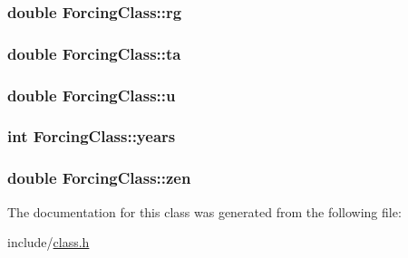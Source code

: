 \subsubsection[{\texorpdfstring{rg}{rg}}]{\setlength{\rightskip}{0pt plus 5cm}double Forcing\+Class\+::rg}\hypertarget{class_forcing_class_a532729ddef9c5b7bc69a9047dae1c846}{}\label{class_forcing_class_a532729ddef9c5b7bc69a9047dae1c846}
\subsubsection[{\texorpdfstring{ta}{ta}}]{\setlength{\rightskip}{0pt plus 5cm}double Forcing\+Class\+::ta}\hypertarget{class_forcing_class_aece37700263c8924187312ba098cd62b}{}\label{class_forcing_class_aece37700263c8924187312ba098cd62b}
\subsubsection[{\texorpdfstring{u}{u}}]{\setlength{\rightskip}{0pt plus 5cm}double Forcing\+Class\+::u}\hypertarget{class_forcing_class_ad22655f39b8411e4ef5dd9d52c76f465}{}\label{class_forcing_class_ad22655f39b8411e4ef5dd9d52c76f465}
\subsubsection[{\texorpdfstring{years}{years}}]{\setlength{\rightskip}{0pt plus 5cm}int Forcing\+Class\+::years}\hypertarget{class_forcing_class_a4100182ae2e6b94113197d349d87244e}{}\label{class_forcing_class_a4100182ae2e6b94113197d349d87244e}
\subsubsection[{\texorpdfstring{zen}{zen}}]{\setlength{\rightskip}{0pt plus 5cm}double Forcing\+Class\+::zen}\hypertarget{class_forcing_class_adadc2319d24d420e89dc8757afc87242}{}\label{class_forcing_class_adadc2319d24d420e89dc8757afc87242}


The documentation for this class was generated from the following file\+:\begin{DoxyCompactItemize}
\item 
include/\hyperlink{class_8h}{class.\+h}\end{DoxyCompactItemize}
